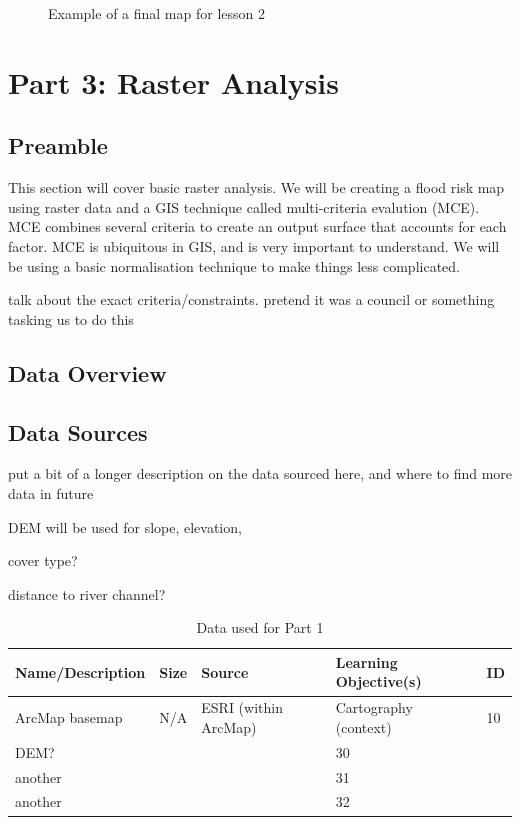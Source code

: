 \documentclass{article}
\begin{document}
\begin{figure}[h]
  \centering
  \caption{Example of a final map for lesson 2}
  \label{2_map}
\end{figure}

\pagebreak
\section{Part 3: Raster Analysis}
\subsection{Preamble}
This section will cover basic raster analysis. We will be creating a flood risk map using raster data and a GIS technique called multi-criteria evalution (MCE). MCE combines several criteria to create an output surface that accounts for each factor. MCE is ubiquitous in GIS, and is very important to understand. We will be using a basic normalisation technique to make things less complicated.

talk about the exact criteria/constraints. pretend it was a council or something tasking us to do this

\subsection{Data Overview}

\subsection{Data Sources}
put a bit of a longer description on the data sourced here, and where to find more data in future

DEM will be used for slope, elevation, 

cover type?

distance to river channel?

\begin{table}[h]
\begin{center}
    \begin{tabular}{ | m{4cm} | m{1cm}| m{3.5cm} | m{5cm} | m{1cm} | } 
    \hline
    \cellcolor{red!35!blue!33!green!33!}\textbf{Name/Description} & 
    \cellcolor{red!35!blue!33!green!33!}\textbf{Size} &
    \cellcolor{red!35!blue!33!green!33!}\textbf{Source} &
    \cellcolor{red!35!blue!33!green!33!}\textbf{Learning Objective(s)} &
    \cellcolor{red!35!blue!33!green!33!}\textbf{ID} \\
    \hline
    ArcMap basemap & N/A & ESRI (within ArcMap) & Cartography (context) & 10 \\
    \hline
    DEM? &  &  & 30 \\
    \hline
    another &  &  & 31 \\
    \hline
    another & & & 32 \\
    \hline
    \end{tabular}
\end{center}
\caption{\label{tb_data_1}Data used for Part 1}
\end{table}
\end{document}
